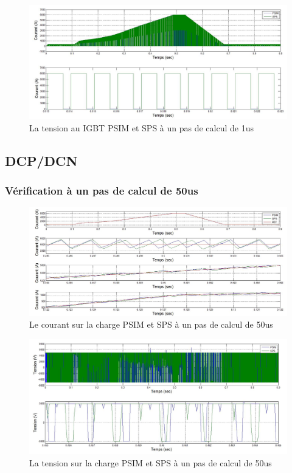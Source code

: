 \documentclass[11pt,letterpaper,final]{report}
\begin{document}
\begin{figure}[h!]
\centering
\includegraphics[scale=0.5]{Fig/Hacheur4Quadrants/HacheurCourantIGBT1u.jpg}
\caption{La tension au IGBT PSIM et SPS à un pas de calcul de 1us}
\label{hc_IG_cou_1}
\end{figure}
\clearpage

\subsection{DCP/DCN}

\subsubsection{Vérification à un pas de calcul de 50us}


\begin{figure}[h!]
\centering
\includegraphics[scale=0.5]{Fig/DCPDCN/DCPCourantCharge50u.jpg}
\caption{Le courant sur la charge PSIM et SPS à un pas de calcul de 50us}
\label{DC_ch_cou_50}
\end{figure}


\begin{figure}[h!]
\centering
\includegraphics[scale=0.5]{Fig/DCPDCN/DCPTensionCharge50u.jpg}
\caption{La tension sur la charge PSIM et SPS à un pas de calcul de 50us}
\label{DC_ch_ten_50}
\end{figure}
\end{document}
